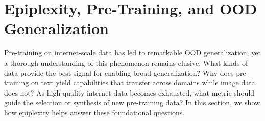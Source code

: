 \documentclass[twoside]{article}
\begin{document}
%
%
%

%
%


%
%

%
%
%
%
%
%
%
%

%


%
%
%
%
%
%

%
%
%
%
%


%
%
%
%
%
%

%

%
%
%
%
%
%
%
%
%

%
%
%
%
%
%
%
%



%

%
%
%
%
%
%
%
%
%
%
%
%

%
%
%
%


%
%
%

%
%

%

%
%
%
%
%
%
%


%
%

%
%
%
%

%
%
%
%
%
%
%
%

%
%
%
%



%



\section{Epiplexity, Pre-Training, and OOD Generalization}
\label{sec:ood}
%

Pre-training on internet-scale data has led to remarkable OOD generalization, yet a thorough understanding of this phenomenon remains elusive. What kinds of data provide the best signal for enabling broad generalization? Why does pre-training on text yield capabilities that transfer across domains while image data does not? As high-quality internet data becomes exhausted, what metric should guide the selection or synthesis of new pre-training data?  In this section, we show how epiplexity helps answer these foundational questions.
\end{document}
